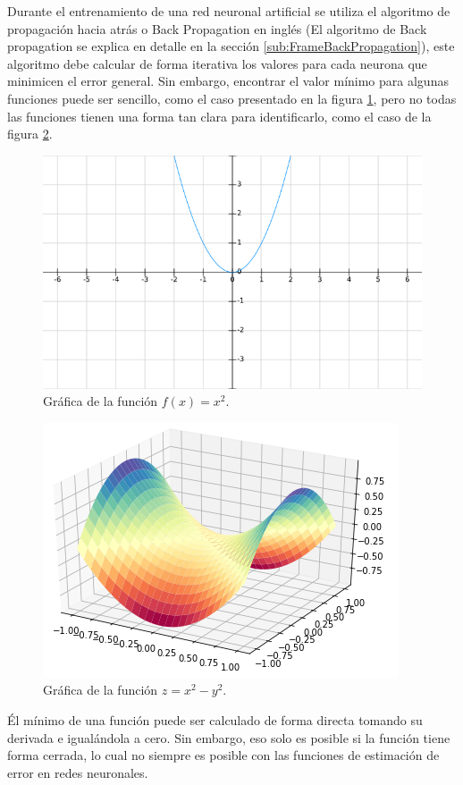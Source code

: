         Durante el entrenamiento de una red neuronal artificial se utiliza el algoritmo de propagación hacia atrás o Back Propagation en inglés (El algoritmo de Back propagation se explica en detalle en la sección \ref{sub:FrameBackPropagation}), este algoritmo debe calcular de forma iterativa los valores para cada neurona que minimicen el error general. Sin embargo, encontrar el valor mínimo para algunas funciones puede ser sencillo, como el caso presentado en la figura \ref{fig:X^2}, pero no todas las funciones tienen una forma tan clara para identificarlo, como el caso de la figura \ref{fig:SillaMontar}.
        
        \begin{figure}[ht!]
        	\centering
        	\includegraphics[width=0.6\linewidth]{imgs/02-Referential/02-X^2.png}
        	\caption[Gráfica de la función $f(x) = x^2$]{Gráfica de la función $f(x) = x^2$.}
    	    \label{fig:X^2}
        \end{figure}%
        
        \begin{figure}[ht!]
        	\centering
        	\includegraphics[width=0.6\linewidth]{imgs/02-Referential/02-X^2-Y^2.png}
        	\caption[Gráfica de la función $z={x}^{2}-{y}^{2}$]{Gráfica de la función $z={x}^{2}-{y}^{2}$.}
    	    \label{fig:SillaMontar}
        \end{figure}%
 
        Él mínimo de una función puede ser calculado de forma directa tomando su derivada e igualándola a cero. Sin embargo, eso solo es posible si la función tiene forma cerrada, lo cual no siempre es posible con las funciones de estimación de error en redes neuronales.
        
